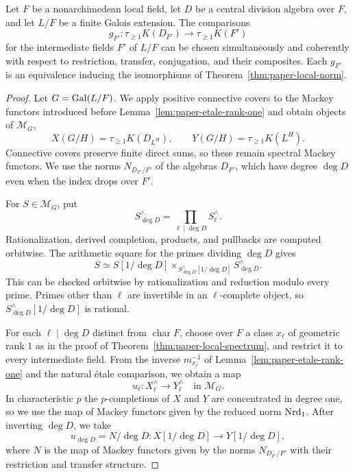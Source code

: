 \begin{proposition}\label{prop:paper-finite-galois-naturality}
Let $F$ be a nonarchimedean local field, let $D$ be a central division algebra over $F$, and let $L/F$ be a finite Galois extension.
The comparisons
\[
 g_{F'}\colon\tau_{\ge1}K(D_{F'})\longrightarrow\tau_{\ge1}K(F')
\]
for the intermediate fields $F'$ of $L/F$ can be chosen simultaneously and coherently with respect to restriction, transfer, conjugation, and their composites.
Each $g_{F'}$ is an equivalence inducing the isomorphisms of Theorem~\ref{thm:paper-local-norm}.
\end{proposition}
\begin{proof}
Let $G=\operatorname{Gal}(L/F)$.
We apply positive connective covers to the Mackey functors introduced before Lemma~\ref{lem:paper-etale-rank-one} and obtain objects of $\mathscr M_G$,
\[
 X(G/H)=\tau_{\ge1}K(D_{L^H}),\qquad
 Y(G/H)=\tau_{\ge1}K(L^H).
\]
Connective covers preserve finite direct sums, so these remain spectral Mackey functors.
We use the norms $N_{D_{F'}/F'}$ of the algebras $D_{F'}$, which have degree $\deg D$ even when the index drops over $F'$.

For $S\in\mathscr M_G$, put
\[
 S^\wedge_{\deg D}=\prod_{\ell\mid\deg D}S^\wedge_\ell.
\]
Rationalization, derived completion, products, and pullbacks are computed orbitwise.
The arithmetic square for the primes dividing $\deg D$ gives
\[
 S\simeq S[1/\deg D]\mathop{\times}_{S^\wedge_{\deg D}[1/\deg D]}S^\wedge_{\deg D}.
\]
This can be checked orbitwise by rationalization and reduction modulo every prime.
Primes other than $\ell$ are invertible in an $\ell$-complete object, so $S^\wedge_{\deg D}[1/\deg D]$ is rational.

For each $\ell\mid\deg D$ distinct from $\operatorname{char}F$, choose over $F$ a class $x_\ell$ of geometric rank $1$ as in the proof of Theorem~\ref{thm:paper-local-spectrum}, and restrict it to every intermediate field.
From the inverse $m_{x_\ell}^{-1}$ of Lemma~\ref{lem:paper-etale-rank-one} and the natural \'etale comparison, we obtain a map
\[
 u_\ell\colon X^\wedge_\ell\longrightarrow Y^\wedge_\ell\quad\text{in }\mathscr M_G.
\]
In characteristic $p$ the $p$-completions of $X$ and $Y$ are concentrated in degree one, so we use the map of Mackey functors given by the reduced norm $\operatorname{Nrd}_1$.
After inverting $\deg D$, we take
\[
 u_{\deg D}=N/\deg D\colon X[1/\deg D]\longrightarrow Y[1/\deg D],
\]
where $N$ is the map of Mackey functors given by the norms $N_{D_{F'}/F'}$ with their restriction and transfer structure.


\end{proof}
